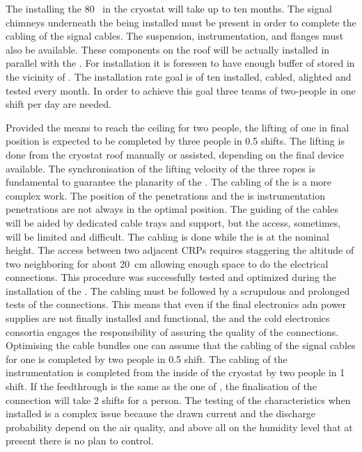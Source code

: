 The installing the 80~ in the cryostat will take up to ten months.
The signal chimneys underneath the  being installed must be present in order to complete the cabling of the signal cables.
The suspension, instrumentation, and  flanges must also be available.
These components on the roof will be actually installed in parallel with the .
For installation it is foreseen to have enough buffer of  stored in the vicinity of .
The installation rate goal is of ten  installed, cabled, alighted and tested every month.
In order to achieve this goal three teams of two-people in one shift per day are needed.

Provided the means to reach the ceiling for two people, the lifting of one  in final position is expected to be completed by three people in 0.5 shifts.
The lifting is done from the cryostat roof manually or assisted, depending on the final device available.
The synchronisation of the lifting velocity of the three ropes is fundamental to guarantee the planarity of the .
The cabling of the  is a more complex work.
The position of the  penetrations and the is  instrumentation penetrations are not always in the optimal position.
The guiding of the cables will be aided by dedicated cable trays and support, but the access, sometimes, will be limited and difficult.
The cabling is done while the  is at the nominal height.
The access between two adjacent CRPs requires staggering the altitude of two neighboring  for about 20~cm allowing enough space to do the electrical connections.
This procedure was successfully tested and optimized during the installation of the .
The cabling must be followed by a scrupulous and prolonged tests of the connections.
This means that even if the final electronics adn power supplies are not finally installed and functional, the  and the cold electronics consortia engages the responsibility of assuring the quality of the connections. 
Optimising the cable bundles one can assume that the cabling of the signal cables for one  is completed by two people in 0.5 shift.
The cabling of the  instrumentation is completed from the inside of the cryostat by two people in 1 shift.
If the   feedthrough is the same as the one of , the finalisation of the connection will take 2 shifts for a person.
The testing of the   characteristics when installed is a complex issue because the drawn current and the discharge probability depend on the air quality, and above all on the humidity level that at present there is no plan to control.
